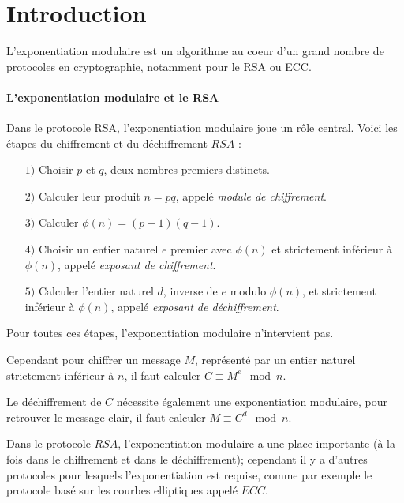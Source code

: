 \documentclass[12pt, a4paper]{memoir}
\begin{document}
\cleardoublepage
\tableofcontents* %
\normalsize

\mainmatter

\chapter{Introduction} 
L'exponentiation modulaire est un algorithme au coeur d'un grand nombre de protocoles en cryptographie, notamment pour le RSA ou ECC.

\subsubsection{L'exponentiation modulaire et le RSA}

Dans le protocole RSA, l'exponentiation modulaire joue un rôle central. Voici les étapes du 
chiffrement et du déchiffrement $RSA$ :
\begin{itemize}
 \item [$1)$] Choisir $p$ et $q$, deux nombres premiers distincts.
 \item [$2)$] Calculer leur produit $n = pq$, appelé \emph{module de chiffrement}.
 \item [$3)$] Calculer $\phi(n) = (p-1)(q-1)$.
 \item [$4)$] Choisir un entier naturel $e$ premier avec $\phi(n)$ et strictement inférieur à $\phi(n)$,
 appelé \emph{exposant de chiffrement}.
 \item [$5)$] Calculer l'entier naturel $d$, inverse de $e$ modulo $\phi(n)$, et strictement inférieur à $\phi(n)$,
 appelé \emph{exposant de déchiffrement}.
\end{itemize}

Pour toutes ces étapes, l'exponentiation modulaire n'intervient pas.

Cependant pour chiffrer un message $M$, représenté par un entier naturel strictement inférieur à $n$, il faut 
calculer $C \equiv M^e \mod n$.

Le déchiffrement de $C$ nécessite également une exponentiation modulaire, pour retrouver le message clair,
il faut calculer $M \equiv C^d \mod n$.

Dans le protocole $RSA$, l'exponentiation modulaire a une place importante (à la fois dans le chiffrement et dans le déchiffrement);
cependant il y a d'autres protocoles pour lesquels l'exponentiation est requise, comme par exemple le protocole
basé sur les courbes elliptiques appelé $ECC$.
\end{document}
